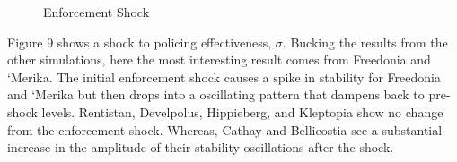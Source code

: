 \documentclass[12pt]{article}
\begin{document}
\begin{spacing}{1.5}
\begin{figure}
\centering
{} 
\caption{Enforcement Shock}

\end{figure}

Figure 9 shows a shock to policing effectiveness, $\sigma$. Bucking the results from the other simulations, here the most interesting result comes from Freedonia and `Merika. The initial enforcement shock causes a spike in stability for Freedonia and `Merika but then drops into a oscillating pattern that dampens back to pre-shock levels. Rentistan, Develpolus, Hippieberg, and Kleptopia show no change from the enforcement shock. Whereas, Cathay and Bellicostia see a substantial increase in the amplitude of their stability oscillations after the shock. 


\end{spacing}
\end{document}
